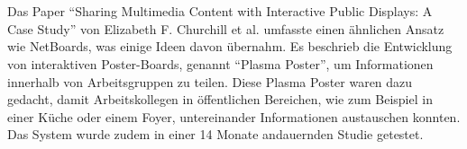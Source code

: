 \\\\
Das Paper ``Sharing Multimedia Content with Interactive Public Displays: A Case Study'' von Elizabeth F. Churchill et al. \cite{churchill:2003,churchill:2004} umfasste einen ähnlichen Ansatz wie NetBoards, was einige Ideen davon übernahm.
Es beschrieb die Entwicklung von interaktiven Poster-Boards, genannt ``Plasma Poster'', um Informationen innerhalb von Arbeitsgruppen zu teilen.
Diese Plasma Poster waren dazu gedacht, damit Arbeitskollegen in öffentlichen Bereichen, wie zum Beispiel in einer Küche oder einem Foyer, untereinander Informationen austauschen konnten.
Das System wurde zudem in einer 14 Monate andauernden Studie getestet.
